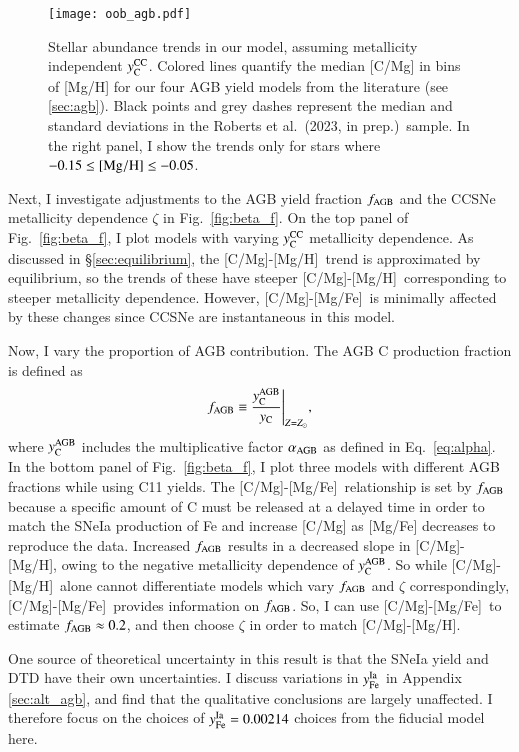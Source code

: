\documentclass[12pt,oneside]{report}
\newcommand{\caah}{[C/Mg]-[Mg/H]}
\newcommand{\caafe}{[C/Mg]-[Mg/Fe]}
\newcommand{\Ycc}{\ensuremath{y_{\rm C}^{\rm CC}}}
\newcommand{\Yct}{\ensuremath{y_{\rm C}}}
\newcommand{\Ycagb}{\ensuremath{y_{\rm C}^{\rm AGB}}}
\newcommand{\citetjack}{Roberts et al.~(2023, in prep.)}
\begin{document}
\begin{figure}
\centering
\texttt{[image: oob\_agb.pdf]}
\caption[AGB GCE Models]{
    Stellar abundance trends in our model, assuming metallicity independent $\Ycc$. Colored lines quantify the median [C/Mg] in bins of [Mg/H] for our four AGB yield models from the literature (see \ref{sec:agb}). Black points and grey dashes represent the median and standard deviations in the \citetjack~sample. In the right panel, I show the trends only for stars where $-0.15\leq {\rm [Mg/H]}\leq -0.05$.
}
\label{fig:agb_sims}
\end{figure}



Next, I investigate adjustments to the AGB yield fraction $f_{\rm AGB}$ and the CCSNe metallicity dependence $\zeta$ in Fig.~\ref{fig:beta_f}. On the top panel of Fig.~\ref{fig:beta_f}, I plot models with varying $\Ycc$ metallicity dependence. As discussed in \S\ref{sec:equilibrium}, the \caah~trend is approximated by equilibrium, so the trends of these have steeper \caah~corresponding to steeper metallicity dependence. However, \caafe~is minimally affected by these changes since CCSNe are instantaneous in this model.

Now, I vary the proportion of AGB contribution.  The AGB C production fraction is defined as
\begin{equation}
    f_{\rm AGB} \equiv \frac{\Ycagb}{\Yct}\Bigg\vert_{Z=Z_\odot},
\end{equation}
where  $\Ycagb$ includes the multiplicative factor $\alpha_{\rm AGB}$ as defined in Eq.~\ref{eq:alpha}.
In the bottom panel of Fig.~\ref{fig:beta_f}, I plot three models with different AGB fractions while using C11 yields.  The \caafe~relationship is set by $f_{\rm AGB}$ because a specific amount of C must be released at a delayed time in order to match the SNeIa production of Fe and increase [C/Mg] as [Mg/Fe] decreases to reproduce the data.
Increased $f_{\rm AGB}$ results in a decreased slope in \caah, owing to the negative metallicity dependence of $\Ycagb$. So while \caah~alone cannot differentiate models which vary $f_{\rm AGB}$ and $\zeta$ correspondingly, \caafe~provides information on $f_{\rm AGB}$. So, I can use \caafe~to estimate $f_{\rm AGB}\approx 0.2$, and then choose $\zeta$ in order to match \caah.

One source of theoretical uncertainty in this result is that the SNeIa yield and DTD have their own uncertainties. I discuss variations in $y_{\rm Fe}^{\rm Ia}$ in Appendix \ref{sec:alt_agb}, and find that the qualitative conclusions are largely unaffected. I therefore focus on the choices of $y_{\rm Fe}^{\rm Ia} = 0.00214$ choices from the fiducial model here.
\end{document}
